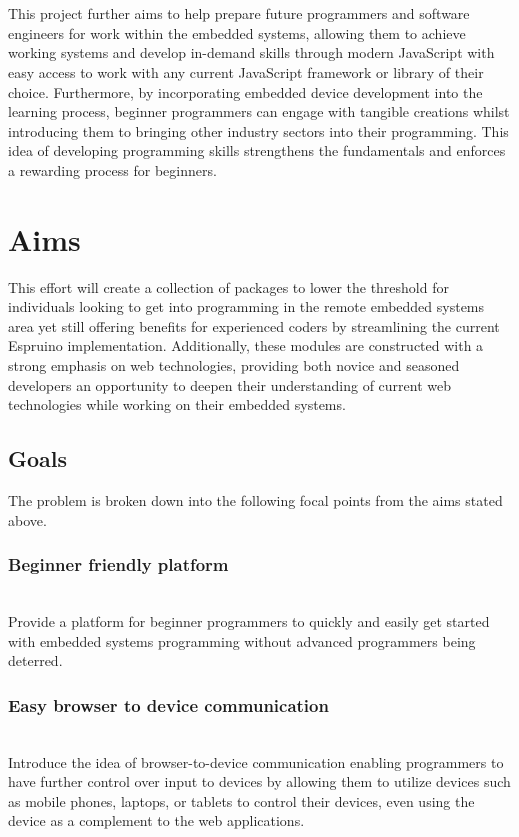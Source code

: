 \documentclass{l4proj}
\begin{document}
\\ \\
This project further aims to help prepare future programmers and software engineers for work within the embedded systems, allowing them to achieve working systems and develop in-demand skills through modern JavaScript with easy access to work with any current JavaScript framework or library of their choice. Furthermore, by incorporating embedded device development into the learning process, beginner programmers can engage with tangible creations whilst introducing them to bringing other industry sectors into their programming. This idea of developing programming skills strengthens the fundamentals and enforces a rewarding process for beginners.

\section{Aims}

\text This effort will create a collection of packages to lower the threshold for individuals looking to get into programming in the remote embedded systems area yet still offering benefits for experienced coders by streamlining the current Espruino implementation. Additionally, these modules are constructed with a strong emphasis on web technologies, providing both novice and seasoned developers an opportunity to deepen their understanding of current web technologies while working on their embedded systems.
\subsection{Goals}
\text The problem is broken down into the following focal points from the aims stated above.
\\
\subsubsection{Beginner friendly platform} \hfill\\
\text Provide a platform for beginner programmers to quickly and easily get started with embedded systems programming without advanced programmers being deterred.
\\
\subsubsection{Easy browser to device communication} \hfill\\
\text Introduce the idea of browser-to-device communication enabling programmers to have further control over input to devices by allowing them to utilize devices such as mobile phones, laptops, or tablets to control their devices, even using the device as a complement to the web applications.
\\
\end{document}
